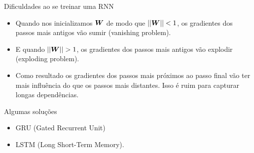\documentclass[10pt]{beamer}
\begin{document}
\begin{frame}{Dificuldades ao se treinar uma RNN}

\begin{itemize}
\item Quando nos inicializamos $\bm{W}$ de modo que $||\bm{W}|| < 1$, os gradientes dos passos mais antigos vão sumir (\alert{vanishing problem}).
\vspace{0.2cm}
\item E quando $||\bm{W}|| > 1$, os gradientes dos passos mais antigos vão explodir (\alert{exploding problem}).
\vspace{0.2cm}
\item Como resultado os gradientes dos passos mais próximos ao passo final vão ter mais influência do que os passos mais distantes. Isso é ruim para capturar \alert{longas dependências}.
\vspace{0.2cm}
\begin{itemize}
 
\vspace{0.3cm}
 
\vspace{0.3cm}
 
\end{itemize}
\end{itemize}
\end{frame}

\begin{frame}{Algumas soluções}
\begin{itemize}
\item GRU (Gated Recurrent Unit)
\vspace{0.2cm}
\item LSTM (Long Short-Term Memory).
\end{itemize}
\vspace{0.2cm}

\end{frame}
\end{document}
